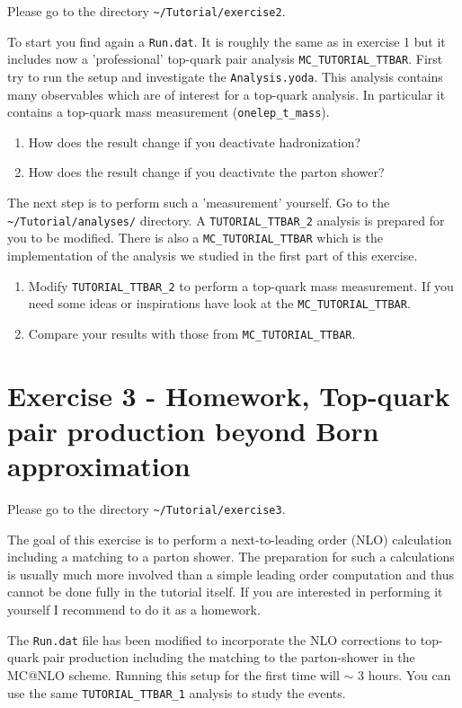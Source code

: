 \documentclass[a4paper,DIV12,fleqn]{scrartcl}
\begin{document}
Please go to the directory \verb|~/Tutorial/exercise2|.


To start you find again a \verb|Run.dat|. It is roughly the same as in
exercise 1 but it includes now a 'professional' top-quark
pair analysis \verb|MC_TUTORIAL_TTBAR|. First try to run the setup and
investigate the \verb|Analysis.yoda|. This analysis contains many observables
which are of interest for a top-quark analysis. In particular it contains
a top-quark mass measurement (\verb|onelep_t_mass|).
\begin{enumerate}
  \item How does the result change if you deactivate hadronization?
  \item How does the result change if you deactivate the parton shower?
\end{enumerate}


The next step is to perform such a 'measurement' yourself. Go to
the \verb|~/Tutorial/analyses/| directory. A \verb|TUTORIAL_TTBAR_2|
analysis is prepared for you to be modified. There is also
a \verb|MC_TUTORIAL_TTBAR| which is the implementation of the
analysis we studied in the first part of this exercise.
\begin{enumerate}
  \item Modify \verb|TUTORIAL_TTBAR_2| to perform a top-quark mass
        measurement. If you need some ideas or inspirations have look at
        the \verb|MC_TUTORIAL_TTBAR|.
  \item Compare your results with those from \verb|MC_TUTORIAL_TTBAR|.
\end{enumerate}

\section{Exercise 3 - Homework, Top-quark pair production beyond Born
         approximation}
\label{sec:task3}
Please go to the directory \verb|~/Tutorial/exercise3|.

The goal of this exercise is to perform a next-to-leading order (NLO)
calculation including a matching to a parton shower.
The preparation for such a calculations
is usually much more involved than a simple leading order computation
and thus cannot be done fully in the tutorial itself. If you are
interested in performing it yourself I recommend to do it as a homework.

The \verb|Run.dat| file has been modified to incorporate the NLO 
corrections to top-quark pair production including the matching to
the parton-shower in the MC@NLO scheme. Running this setup for the first
time will $\sim$ 3 hours. You can use the same \verb|TUTORIAL_TTBAR_1|
analysis to study the events.
\end{document}
